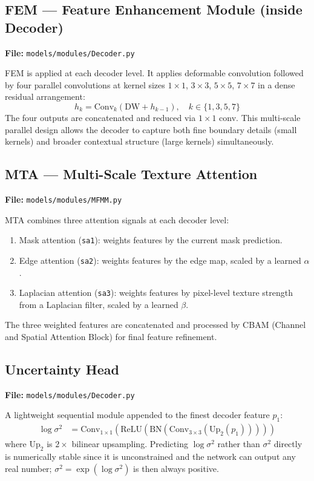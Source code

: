 \documentclass[12pt,a4paper]{report}
\begin{document}
\subsection{FEM — Feature Enhancement Module (inside Decoder)}

\textbf{File:} \texttt{models/modules/Decoder.py}

FEM is applied at each decoder level. It applies deformable convolution followed by four parallel convolutions at kernel sizes $1\times1$, $3\times3$, $5\times5$, $7\times7$ in a dense residual arrangement:
\begin{equation}
  h_k = \text{Conv}_{k}(\text{DW} + h_{k-1}),\quad k \in \{1,3,5,7\}
  \label{eq:fem}
\end{equation}
The four outputs are concatenated and reduced via $1\times1$ conv. This multi-scale parallel design allows the decoder to capture both fine boundary details (small kernels) and broader contextual structure (large kernels) simultaneously.

\subsection{MTA — Multi-Scale Texture Attention}

\textbf{File:} \texttt{models/modules/MFMM.py}

MTA combines three attention signals at each decoder level:
\begin{enumerate}
  \item Mask attention (\texttt{sa1}): weights features by the current mask prediction.
  \item Edge attention (\texttt{sa2}): weights features by the edge map, scaled by a learned $\alpha$.
  \item Laplacian attention (\texttt{sa3}): weights features by pixel-level texture strength from a Laplacian filter, scaled by a learned $\beta$.
\end{enumerate}
The three weighted features are concatenated and processed by CBAM (Channel and Spatial Attention Block) for final feature refinement.

\subsection{Uncertainty Head}

\textbf{File:} \texttt{models/modules/Decoder.py}

A lightweight sequential module appended to the finest decoder feature $p_1$:
\begin{align}
  \log\sigma^2 &= \text{Conv}_{1\times1}\!\left(\text{ReLU}\!\left(\text{BN}\!\left(\text{Conv}_{3\times3}(\text{Up}_2(p_1))\right)\right)\right)
  \label{eq:unchead}
\end{align}
where $\text{Up}_2$ is $2\times$ bilinear upsampling. Predicting $\log\sigma^2$ rather than $\sigma^2$ directly is numerically stable since it is unconstrained and the network can output any real number; $\sigma^2 = \exp(\log\sigma^2)$ is then always positive.
\end{document}
